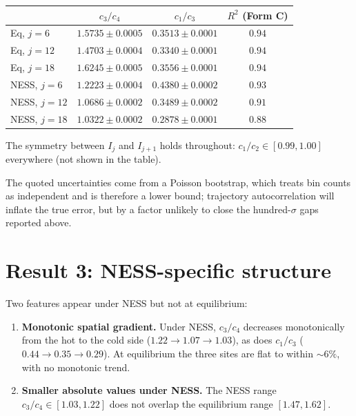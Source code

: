 \documentclass[11pt]{article}
\begin{document}
\begin{center}
\begin{tabular}{lccc}
\toprule
 & $c_3/c_4$ & $c_1/c_3$ & $R^2$ (Form C) \\
\midrule
Eq, $j=6$  & $1.5735 \pm 0.0005$ & $0.3513 \pm 0.0001$ & $0.94$ \\
Eq, $j=12$ & $1.4703 \pm 0.0004$ & $0.3340 \pm 0.0001$ & $0.94$ \\
Eq, $j=18$ & $1.6245 \pm 0.0005$ & $0.3556 \pm 0.0001$ & $0.94$ \\[2pt]
NESS, $j=6$  & $1.2223 \pm 0.0004$ & $0.4380 \pm 0.0002$ & $0.93$ \\
NESS, $j=12$ & $1.0686 \pm 0.0002$ & $0.3489 \pm 0.0002$ & $0.91$ \\
NESS, $j=18$ & $1.0322 \pm 0.0002$ & $0.2878 \pm 0.0001$ & $0.88$ \\
\bottomrule
\end{tabular}
\end{center}

The symmetry between $I_j$ and $I_{j+1}$ holds throughout:
$c_1/c_2 \in [0.99, 1.00]$ everywhere (not shown in the table).

The quoted uncertainties come from a Poisson bootstrap, which treats bin counts
as independent and is therefore a lower bound; trajectory autocorrelation will
inflate the true error, but by a factor unlikely to close the hundred-$\sigma$
gaps reported above.

\section*{Result 3: NESS-specific structure}
Two features appear under NESS but not at equilibrium:
\begin{enumerate}
\item \textbf{Monotonic spatial gradient.} Under NESS, $c_3/c_4$ decreases
monotonically from the hot to the cold side ($1.22 \to 1.07 \to 1.03$), as does
$c_1/c_3$ ($0.44 \to 0.35 \to 0.29$). At equilibrium the three sites are flat to
within ${\sim}6\%$, with no monotonic trend.
\item \textbf{Smaller absolute values under NESS.} The NESS range
$c_3/c_4\in[1.03,1.22]$ does not overlap the equilibrium range $[1.47,1.62]$.
\end{enumerate}
\end{document}
